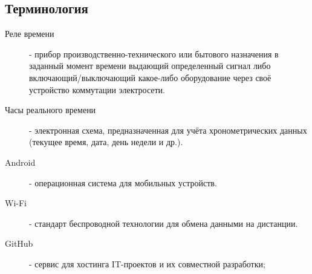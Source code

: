 \subsection{Терминология}

\begin{description}

\item[Реле времени] - прибор производственно-технического или бытового назначения в заданный момент времени выдающий определенный сигнал либо включающий/выключающий какое-либо оборудование через своё устройство коммутации электросети.  

\item[Часы реального времени] - электронная схема, предназначенная для учёта хронометрических данных (текущее время, дата, день недели и др.).

\item[Android] - операционная система для мобильных устройств.

\item[Wi-Fi] - стандарт беспроводной технологии для обмена данными на дистанции.

\item[GitHub] - сервис для хостинга IT-проектов и их совместной разработки;

\end{description}

